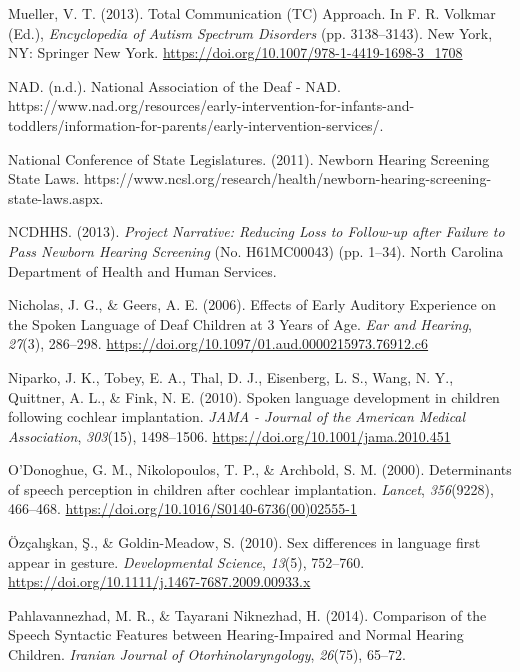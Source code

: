 \documentclass[
  english,
  man]{apa6}
\begin{document}
\leavevmode\hypertarget{ref-mueller2013}{}%
Mueller, V. T. (2013). Total Communication (TC) Approach. In F. R. Volkmar (Ed.), \emph{Encyclopedia of Autism Spectrum Disorders} (pp. 3138--3143). New York, NY: Springer New York. \url{https://doi.org/10.1007/978-1-4419-1698-3_1708}

\leavevmode\hypertarget{ref-nad}{}%
NAD. (n.d.). National Association of the Deaf - NAD. https://www.nad.org/resources/early-intervention-for-infants-and-toddlers/information-for-parents/early-intervention-services/.

\leavevmode\hypertarget{ref-nationalconferenceofstatelegislatures2011}{}%
National Conference of State Legislatures. (2011). Newborn Hearing Screening State Laws. https://www.ncsl.org/research/health/newborn-hearing-screening-state-laws.aspx.

\leavevmode\hypertarget{ref-ncdhhs2013}{}%
NCDHHS. (2013). \emph{Project Narrative: Reducing Loss to Follow-up after Failure to Pass Newborn Hearing Screening} (No. H61MC00043) (pp. 1--34). North Carolina Department of Health and Human Services.

\leavevmode\hypertarget{ref-nicholas2006}{}%
Nicholas, J. G., \& Geers, A. E. (2006). Effects of Early Auditory Experience on the Spoken Language of Deaf Children at 3 Years of Age. \emph{Ear and Hearing}, \emph{27}(3), 286--298. \url{https://doi.org/10.1097/01.aud.0000215973.76912.c6}

\leavevmode\hypertarget{ref-niparko2010}{}%
Niparko, J. K., Tobey, E. A., Thal, D. J., Eisenberg, L. S., Wang, N. Y., Quittner, A. L., \& Fink, N. E. (2010). Spoken language development in children following cochlear implantation. \emph{JAMA - Journal of the American Medical Association}, \emph{303}(15), 1498--1506. \url{https://doi.org/10.1001/jama.2010.451}

\leavevmode\hypertarget{ref-odonoghue2000}{}%
O'Donoghue, G. M., Nikolopoulos, T. P., \& Archbold, S. M. (2000). Determinants of speech perception in children after cochlear implantation. \emph{Lancet}, \emph{356}(9228), 466--468. \url{https://doi.org/10.1016/S0140-6736(00)02555-1}

\leavevmode\hypertarget{ref-ozcaliskan2010}{}%
Özçalışkan, Ş., \& Goldin-Meadow, S. (2010). Sex differences in language first appear in gesture. \emph{Developmental Science}, \emph{13}(5), 752--760. \url{https://doi.org/10.1111/j.1467-7687.2009.00933.x}

\leavevmode\hypertarget{ref-pahlavannezhad2014}{}%
Pahlavannezhad, M. R., \& Tayarani Niknezhad, H. (2014). Comparison of the Speech Syntactic Features between Hearing-Impaired and Normal Hearing Children. \emph{Iranian Journal of Otorhinolaryngology}, \emph{26}(75), 65--72.
\end{document}
